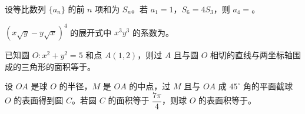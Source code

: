 \begin{question}
设等比数列 $\{a_n\}$ 的前 $n$ 项和为 $S_n$。若 $a_1=1$，$S_6=4S_3$，则 $a_4=$\gkblank{}。

\end{question}
\begin{question}
$(x\sqrt y-y\sqrt x)^4$ 的展开式中 $x^3y^3$ 的系数为\gkblank{}。

\end{question}
\begin{question}
已知圆 $O:x^2+y^2=5$ 和点 $A(1,2)$，则过 $A$ 且与圆 $O$ 相切的直线与两坐标轴围成的三角形的面积等于\gkblank{}。

\end{question}
\begin{question}
设 $OA$ 是球 $O$ 的半径，$M$ 是 $OA$ 的中点，过 $M$ 且与 $OA$ 成 $45^\circ$ 角的平面截球 $O$ 的表面得到圆 $C$。若圆 $C$ 的面积等于 $\dfrac{7\pi}{4}$，则球 $O$ 的表面积等于\gkblank{}。

\end{question}

